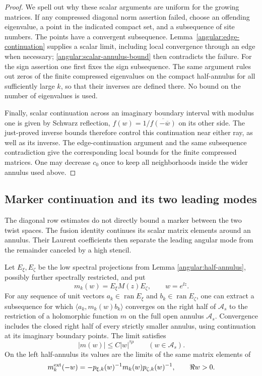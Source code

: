 \begin{proof}
We spell out why these scalar arguments are uniform for the growing
matrices.  If any compressed diagonal norm assertion failed, choose
an offending eigenvalue, a point in the indicated compact set, and a
subsequence of site numbers.  The points have a convergent
subsequence.  Lemma~\ref{angular:edge-continuation} supplies a scalar
limit, including local convergence through an edge when necessary;
\eqref{angular:scalar-annulus-bound} then contradicts the failure.
For the sign assertion one first fixes the sign subsequence.  The
same argument rules out zeros of the finite compressed eigenvalues
on the compact half-annulus for all sufficiently large $k$, so that
their inverses are defined there.  No bound on the number of
eigenvalues is used.

Finally, scalar continuation across an imaginary boundary interval
with modulus one is given by Schwarz reflection,
$f(w)=1/\overline{f(-\overline w)}$ on its other side.  The just-proved
inverse bounds therefore control this continuation near either ray,
as well as its inverse.  The edge-continuation argument and the same
subsequence contradiction give the corresponding local bounds for
the finite compressed matrices.  One may decrease $c_0$ once to keep
all neighborhoods inside the wider annulus used above.
\end{proof}

\subsection{Marker continuation and its two leading modes}

The diagonal row estimates do not directly bound a marker between the
two twist spaces.  The fusion identity continues its scalar matrix
elements around an annulus.  Their Laurent coefficients then separate
the leading angular mode from the remainder canceled by a high stencil.

\begin{lemma}
\label{angular:marker-continuation}
Let $E_\xi,E_\zeta$ be the low spectral projections from Lemma
\ref{angular:half-annulus}, possibly further spectrally restricted,
and put
\[
 m_k(w)=E_\xi M(z)E_\zeta,\qquad w=e^{\ii z}.
\]
For any sequence of unit vectors $a_k\in\operatorname{ran}E_\xi$ and
$b_k\in\operatorname{ran}E_\zeta$, one can extract a subsequence for
which $\langle a_k,m_k(w)b_k\rangle$ converges on the right half of
$\mathcal A_s$ to the restriction of a holomorphic function $m$ on
the full open annulus $\mathcal A_s$.  Convergence includes the closed
right half of every strictly smaller annulus, using continuation at
its imaginary boundary points.  The limit satisfies
\begin{equation}\label{angular:marker-growth}
 |m(w)|\le C|w|^{\tau\rho}\qquad(w\in\mathcal A_s).
\end{equation}
On the left half-annulus its values are the limits of the same
matrix elements of
\begin{equation}\label{angular:external-marker}
 m_k^{\rm ext}(-w)
 =-p_{\xi,k}(w)^{-1}m_k(w)p_{\zeta,k}(w)^{-1},
 \qquad \Re w>0.
\end{equation}
\end{lemma}

